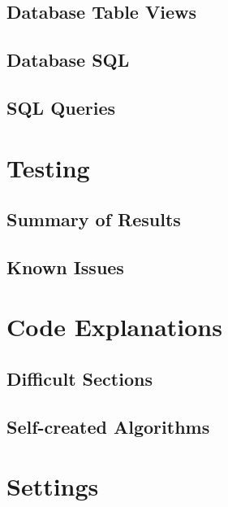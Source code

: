 \subsection{Database Table Views}

\subsection{Database SQL}

\subsection{SQL Queries}

\section{Testing}

\subsection{Summary of Results}

\subsection{Known Issues}


\section{Code Explanations}
\begin{comment}
\begin{figure}[H]
    \pythonfile[firstline=5,lastline=5]{./tex/function_programs/print_function.py}
    \caption{The print() function} \label{fig:print_function}
\end{figure}
\end{comment}


\subsection{Difficult Sections}

\subsection{Self-created Algorithms}

\section{Settings}

